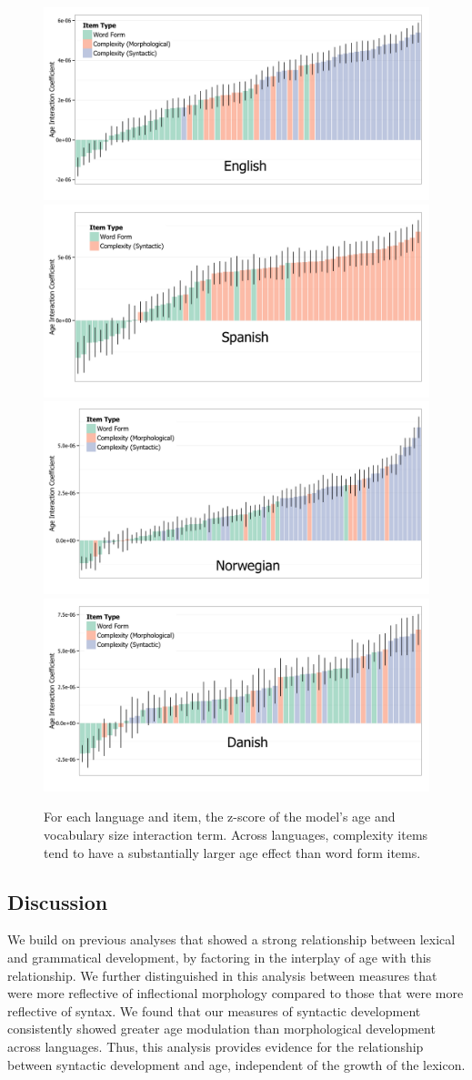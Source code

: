 \documentclass[10pt,letterpaper]{article}
\begin{document}
\begin{figure}[t]
\centering
\includegraphics[width=.49\textwidth]{plots/english_interactions}
\includegraphics[width=.49\textwidth]{plots/spanish_interactions} \\
\includegraphics[width=.49\textwidth]{plots/norwegian_interactions}
\includegraphics[width=.49\textwidth]{plots/danish_interactions}
\caption{\label{fig:interactions} For each language and item, the z-score of the model's age and vocabulary size interaction term. Across languages, complexity items tend to have a substantially larger age effect than word form items.}
\end{figure}

\subsection{Discussion}

We build on previous analyses that showed a strong relationship between lexical and grammatical development, by factoring in the interplay of age with this relationship. We further distinguished in this analysis between measures that were more reflective of inflectional morphology compared to those that were more reflective of syntax.  We found that our measures of syntactic development consistently showed greater age modulation than morphological development across languages. Thus, this analysis provides evidence for the relationship between syntactic development and age, independent of the growth of the lexicon. 
\end{document}
